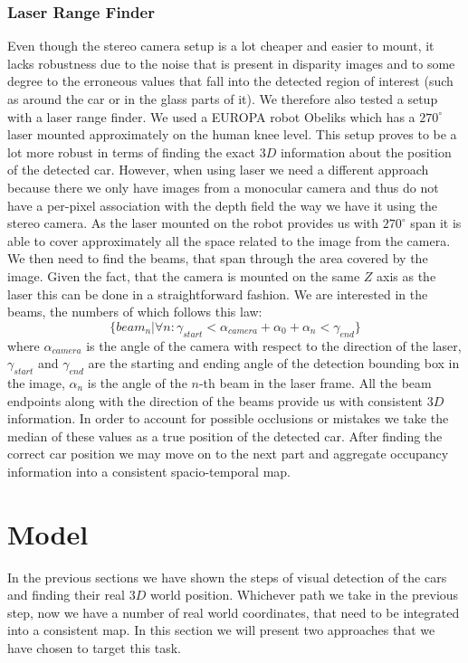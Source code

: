         \subsubsection{Laser Range Finder}\label{ssub:laser_range_finder}
            Even though the stereo camera setup is a lot cheaper and easier to mount, it lacks robustness due to the noise that is present in disparity images and to some degree to the erroneous values that fall into the detected region of interest (such as around the car or in the glass parts of it). We therefore also tested a setup with a laser range finder. We used a EUROPA robot Obeliks which has a $270^\circ$ laser mounted approximately on the human knee level. This setup proves to be a lot more robust in terms of finding the exact $3D$ information about the position of the detected car.
            However, when using laser we need a different approach because there we only have images from a monocular camera and thus do not have a per-pixel association with the depth field the way we have it using the stereo camera.
            As the laser mounted on the robot provides us with $270^\circ$ span it is able to cover approximately all the space related to the image from the camera. We then need to find the beams, that span through the area covered by the image. Given the fact, that the camera is mounted on the same $Z$ axis as the laser this can be done in a straightforward fashion. We are interested in the beams, the numbers of which follows this law:
            $$ \{ beam_n | \forall n : \gamma_{start} < \alpha_{camera} + \alpha_{0} + \alpha_{n} < \gamma_{end} \}$$
            where $\alpha_{camera}$ is the angle of the camera with respect to the direction of the laser, $\gamma_{start}$ and $\gamma_{end}$ are the starting and ending angle of the detection bounding box in the image, $\alpha_{n}$ is the angle of the $n$-th beam in the laser frame.
            All the beam endpoints along with the direction of the beams provide us with consistent $3D$ information. In order to account for possible occlusions or mistakes we take the median of these values as a true position of the detected car.
            After finding the correct car position we may move on to the next part and aggregate occupancy information into a consistent spacio-temporal map.

\section{Model} %
\label{sec:model}
    In the previous sections we have shown the steps of visual detection of the cars and finding their real $3D$ world position.
    Whichever path we take in the previous step, now we have a number of real world coordinates, that need to be integrated into a consistent map. In this section we will present two approaches that we have chosen to target this task.
